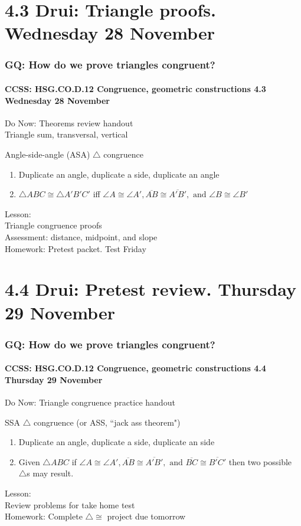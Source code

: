 \documentclass{beamer}
\begin{document}
\section{4.3 Drui: Triangle proofs. Wednesday 28 November}
  \frame
  {
    \frametitle{GQ: How do we prove triangles congruent?}
    \framesubtitle{CCSS: HSG.CO.D.12 Congruence, geometric constructions  \alert{4.3 Wednesday 28 November}}
    Do Now: Theorems review handout \\
    Triangle sum, transversal, vertical
    \begin{block}{Angle-side-angle (ASA) $\triangle$ congruence}
    \begin{enumerate}
        \item Duplicate an angle, duplicate a side, duplicate an angle
        \item $\triangle ABC \cong \triangle A'B'C'$ iff $\angle A \cong \angle A', \overline{AB} \cong \overline{A'B'}, \text{ and } \angle B \cong \angle B'$
    \end{enumerate}
    \end{block}
    Lesson: \\
    Triangle congruence proofs\\
    Assessment: distance, midpoint, and slope\\[0.5cm]
    Homework: Pretest packet. \alert{Test Friday}
  }

\section{4.4 Drui: Pretest review. Thursday 29 November}
  \frame
  {
    \frametitle{GQ: How do we prove triangles congruent?}
    \framesubtitle{CCSS: HSG.CO.D.12 Congruence, geometric constructions  \alert{4.4 Thursday 29 November}}

    Do Now: Triangle congruence practice handout

    \begin{block}{SSA $\triangle$ congruence (or ASS, ``jack ass theorem")}
    \begin{enumerate}
        \item Duplicate an angle, duplicate a side, duplicate an side
        \item Given $\triangle ABC$ if $ \angle A \cong \angle A', \overline{AB} \cong \overline{A'B'}, \text{ and } \overline{BC} \cong \overline{B'C'}$ then two possible $\triangle$s may result.
    \end{enumerate}
    \end{block}
    Lesson: \\
    Review problems for take home test\\[0.5cm]
    Homework: Complete $\triangle \cong$ project \alert{due tomorrow}
  }
\end{document}
